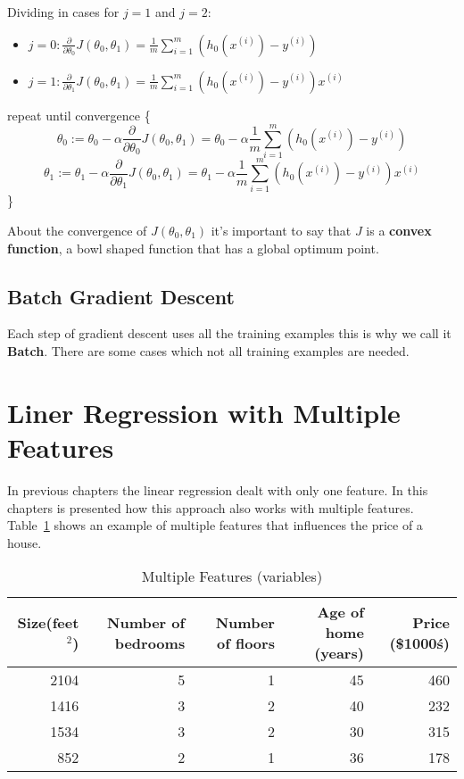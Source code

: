 \documentclass[a4paper]{article}
\begin{document}
Dividing in cases for $j = 1$ and $j = 2$:

\begin{itemize}
\item $j = 0: \frac{\partial}{\partial \theta_0}J(\theta_0,\theta_1) = \frac{1}{m}\sum_{i=1}^m (h_0(x^{(i)}) - y^{(i)})$
\item $j = 1: \frac{\partial}{\partial \theta_1}J(\theta_0,\theta_1) = \frac{1}{m}\sum_{i=1}^m (h_0(x^{(i)}) - y^{(i)}) x^{(i)}$
\end{itemize}

\medskip

repeat until convergence \{
$$
\theta_0 := \theta_0 - \alpha \frac{\partial}{\partial \theta_0}J(\theta_0,\theta_1) = \theta_0 - \alpha \frac{1}{m}\sum_{i=1}^m (h_0(x^{(i)}) - y^{(i)})
$$
$$
\theta_1 := \theta_1 - \alpha \frac{\partial}{\partial \theta_1}J(\theta_0,\theta_1) = \theta_1 - \alpha \frac{1}{m}\sum_{i=1}^m (h_0(x^{(i)}) - y^{(i)}) x^{(i)}
$$
\}

About the convergence of $J(\theta_0,\theta_1)$ it's important to say that $J$ is a \textbf{convex function}, a bowl shaped function that has a global optimum point.

\subsection{Batch Gradient Descent}

Each step of gradient descent uses all the training examples this is why we call it \textbf{Batch}. There are some cases which not all training examples are needed.

\section{Liner Regression with Multiple Features}

In previous chapters the linear regression dealt with only one feature. In this chapters is presented how this approach also works with multiple features. Table~\ref{tab:multiple-features-example} shows an example of multiple features that influences the price of a house.

\begin{table}[]
\centering
\begin{tabular}{|r|r|r|r|r|}
\textbf{Size(feet$^2$)} & \textbf{Number of bedrooms} & \textbf{Number of floors} & \textbf{Age of home (years)} & \textbf{Price (\$1000\'s)} \\ \hline
2104 & 5 & 1 & 45 & 460 \\
1416 & 3 & 2 & 40 & 232 \\
1534 & 3 & 2 & 30 & 315 \\
852  & 2 & 1 & 36 & 178
\end{tabular}
\caption{Multiple Features (variables)}
\label{tab:multiple-features-example}
\end{table}
\end{document}
